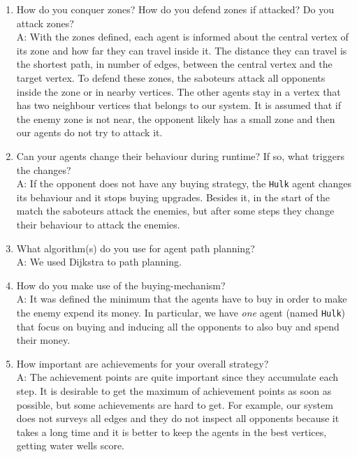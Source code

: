 \begin{enumerate}
	\item  How do you conquer zones? How do you defend zones if attacked? Do you attack zones?\\
	A: With the zones defined, each agent is informed about the central vertex of its zone and how far they can travel inside it. The distance they can travel is the shortest path, in  number of edges, between the central vertex and the target vertex. To defend these zones, the saboteurs attack all opponents inside the zone or in nearby vertices. The other agents stay in a vertex that has two neighbour vertices that belongs to our system. It is assumed that if the enemy zone is not near, the opponent likely has a small zone and then our agents do not try to attack it.%


	\item  Can your agents change their behaviour during runtime? If so, what triggers the changes?\\
	A: If the opponent does not have any buying strategy, the \texttt{Hulk} agent changes its behaviour and it stops buying upgrades. Besides it, in the start of the match the saboteurs attack the enemies, but after some steps they change their behaviour to attack the enemies. %


	\item  What algorithm(s) do you use for agent path planning? \\
	A: We used Dijkstra to path planning.%


	\item  How do you make use of the buying-mechanism?\\
	A: It was defined the minimum that the agents have to buy in order to make the enemy expend its money. In particular, we have \emph{one} agent (named \texttt{Hulk}) that focus on buying and inducing all the opponents to also buy and spend their money.%


	\item  How important are achievements for your overall strategy?\\
	A: The achievement points are quite important since they accumulate each step. It is desirable to get the maximum of achievement points as soon as possible, but some achievements are hard to get. For example, our system does not surveys all edges and they do not inspect all opponents because it takes a long time and it is better to keep the agents in the best vertices, getting water wells score. %



\end{enumerate}
